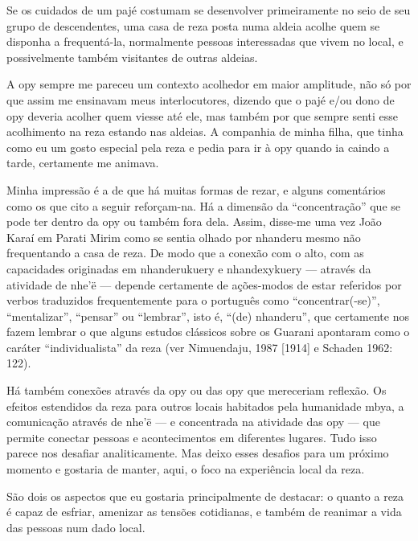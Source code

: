 \documentclass{article}
\begin{document}
Se os cuidados de um paj\'e costumam se desenvolver primeiramente no
seio de seu grupo de descendentes, uma casa de reza posta numa aldeia
acolhe quem se disponha a frequent\'a-la, normalmente pessoas
interessadas que vivem no local, e possivelmente tamb\'em visitantes de
outras aldeias.

A opy sempre me pareceu um contexto acolhedor em maior amplitude, n\~ao
s\'o por que assim me ensinavam meus interlocutores, dizendo que o
paj\'e e/ou dono de opy deveria acolher quem viesse at\'e ele, mas
tamb\'em por que sempre senti esse acolhimento na reza estando nas
aldeias. A companhia de minha filha, que tinha como eu um gosto
especial pela reza e pedia para ir \`a opy quando ia caindo a tarde,
certamente me animava.

Minha impress\~ao \'e a de que h\'a muitas formas de rezar, e alguns
coment\'arios como os que cito a seguir refor\c{c}am-na. H\'a a
dimens\~ao da {\textquotedblleft}concentra\c{c}\~ao{\textquotedblright}
que se pode ter dentro da opy ou tamb\'em fora dela. Assim, disse-me
uma vez Jo\~ao Kara\'i em Parati Mirim como se sentia olhado por
nhanderu mesmo n\~ao frequentando a casa de reza. De modo que a
conex\~ao com o alto, com as capacidades originadas em nhanderukuery e
nhandexykuery --- atrav\'es da atividade de nhe{\textquoteright}\"e
{}--- depende certamente de a\c{c}\~oes-modos de estar referidos por
verbos traduzidos frequentemente para o portugu\^es como
{\textquotedblleft}concentrar(-se){\textquotedblright}, 
{\textquotedblleft}mentalizar{\textquotedblright},
{\textquotedblleft}pensar{\textquotedblright} ou
{\textquotedblleft}lembrar{\textquotedblright}, isto \'e,
{\textquotedblleft}(de) nhanderu{\textquotedblright}, que certamente
nos fazem lembrar o que alguns estudos cl\'assicos sobre os Guarani
apontaram como o car\'ater
{\textquotedblleft}individualista{\textquotedblright} da reza (ver
Nimuendaju, 1987 [1914] e Schaden 1962: 122). 

H\'a tamb\'em conex\~oes atrav\'es da opy ou das opy que mereceriam
reflex\~ao. Os efeitos estendidos da reza para outros locais habitados
pela humanidade mbya, a comunica\c{c}\~ao atrav\'es de
nhe{\textquoteright}\"e --- e concentrada na atividade das opy --- que
permite conectar pessoas e acontecimentos em diferentes lugares. Tudo
isso parece nos desafiar analiticamente. Mas deixo esses desafios para
um pr\'oximo momento e gostaria de manter, aqui, o foco na
experi\^encia local da reza.

S\~ao dois os aspectos que eu gostaria principalmente de destacar: o
quanto a reza \'e capaz de esfriar, amenizar as tens\~oes cotidianas, e
tamb\'em de reanimar a vida das pessoas num dado local.
\end{document}
